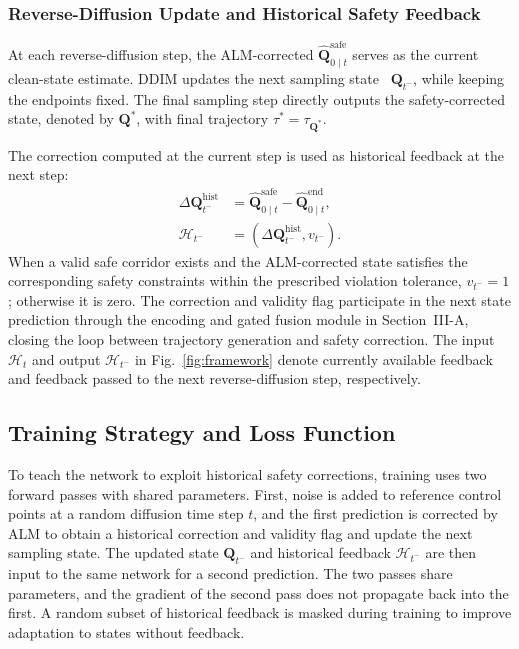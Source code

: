 \documentclass[journal]{IEEEtran}
\begin{document}
\subsubsection{Reverse-Diffusion Update and Historical Safety Feedback}
At each reverse-diffusion step, the ALM-corrected
$\widehat{\mathbf Q}_{0\mid t}^{\mathrm{safe}}$ serves as the current clean-state
estimate. DDIM updates the next sampling state~\cite{ddim}
$\mathbf Q_{t^{-}}$, while keeping the endpoints fixed. The final sampling
step directly outputs the safety-corrected state, denoted by $\mathbf Q^\ast$,
with final trajectory $\tau^\ast=\tau_{\mathbf Q^\ast}$.

The correction computed at the current step is used as historical feedback
at the next step:
\begin{equation}
\begin{aligned}
\Delta\mathbf Q_{t^{-}}^{\mathrm{hist}}
&=\widehat{\mathbf Q}_{0\mid t}^{\mathrm{safe}}
-\widehat{\mathbf Q}_{0\mid t}^{\mathrm{end}},\\
\mathcal H_{t^{-}}&=(\Delta\mathbf Q_{t^{-}}^{\mathrm{hist}},v_{t^{-}}).
\end{aligned}
\end{equation}
When a valid safe corridor exists and the ALM-corrected state satisfies the
corresponding safety constraints within the prescribed violation tolerance,
$v_{t^{-}}=1$; otherwise it is zero. The correction and validity flag participate
in the next state prediction through the encoding and gated fusion module in
Section~III-A, closing the loop between trajectory generation and safety
correction. The input $\mathcal H_t$ and output $\mathcal H_{t^{-}}$ in
Fig.~\ref{fig:framework} denote currently available feedback and feedback
passed to the next reverse-diffusion step, respectively.

\subsection{Training Strategy and Loss Function}
To teach the network to exploit historical safety corrections, training uses
two forward passes with shared parameters. First, noise is added to reference
control points at a random diffusion time step $t$, and the first prediction
is corrected by ALM to obtain a historical correction and validity flag and
update the next sampling state. The updated state $\mathbf Q_{t^{-}}$ and
historical feedback $\mathcal H_{t^{-}}$ are then input to the same network
for a second prediction. The two passes share parameters, and the gradient
of the second pass does not propagate back into the first. A random subset
of historical feedback is masked during training to improve adaptation to
states without feedback.
\end{document}
